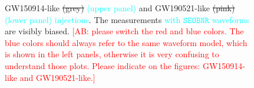 \documentclass[twocolumn,prd,aps,superscriptaddress,preprintnumbers,tightenlines,showpacs,nofootinbib,eqsecnum,amsfonts,amsmath]{revtex4-1}
\newcommand{\ab}[1]{\textcolor{cyan}{#1}}
\newcommand{\comment}[1]{\textcolor{red}{[#1]}}
\newcommand{\SEOB}{\texttt{SEOBNR}}
\begin{document}
\begin{figure}
\begin{center}
{GW150914-like \sout{(grey)} \ab{(upper panel)} and GW190521-like \sout{(pink)} \ab{(lower panel) injections}. The measurements \ab{with $\SEOB$ waveforms} are visibly biased. \comment{AB: please 
switch the red and blue colors. The blue colors should always refer to the same waveform model, which is shown in the left panels, otherwise it is very confusing to understand those plots. Please indicate on the figures: GW150914-like and GW190521-like.}}
	\label{fig:simulated_signal_nonGR}
\end{center}
\end{figure}

\end{document}
